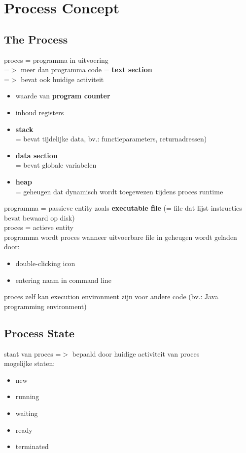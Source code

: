 \documentclass{report}
\begin{document}
\section{Process Concept}
\subsection{The Process}
proces  = programma in uitvoering
\\=$>$ meer dan programma code = \textbf{text section}
\\=$>$ bevat ook huidige activiteit 
\begin{itemize}
\item waarde van \textbf{program counter}
\item inhoud registers
\item \textbf{stack}
\\ = bevat tijdelijke data, bv.: functieparameters, returnadressen)
\item \textbf{data section}
\\ = bevat globale variabelen
\item \textbf{heap}
\\ = geheugen dat dynamisch wordt toegewezen tijdens proces runtime
\end{itemize}
programma = passieve entity zoals \textbf{executable file} (= file dat lijst instructies bevat bewaard op disk)
\\proces = actieve entity
\\programma wordt proces wanneer uitvoerbare file in geheugen wordt geladen door:
\begin{itemize}
\item double-clicking icon 
\item entering naam in command line
\end{itemize}
proces zelf kan execution environment zijn voor andere code (bv.: Java programming environment)

\subsection{Process State}
staat van proces =$>$ bepaald door huidige activiteit van proces
\\mogelijke staten:
\begin{itemize}
\item new
\item running
\item waiting
\item ready
\item terminated
\end{itemize}
\end{document}
